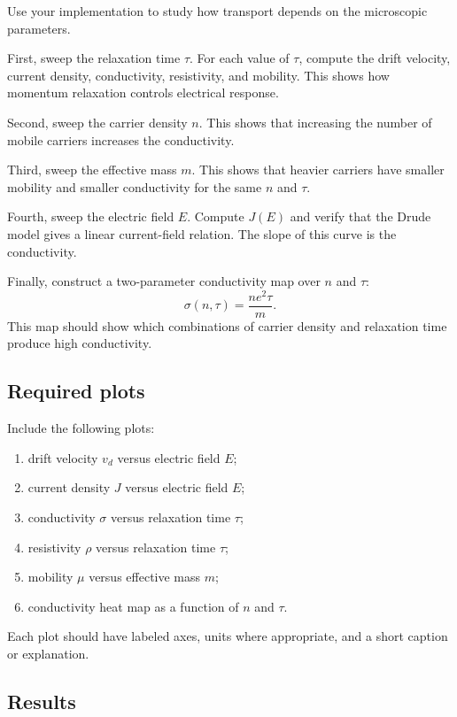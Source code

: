 Use your implementation to study how transport depends on the microscopic parameters.

First, sweep the relaxation time \(\tau\). For each value of \(\tau\), compute the drift velocity, current density, conductivity, resistivity, and mobility. This shows how momentum relaxation controls electrical response.

Second, sweep the carrier density \(n\). This shows that increasing the number of mobile carriers increases the conductivity.

Third, sweep the effective mass \(m\). This shows that heavier carriers have smaller mobility and smaller conductivity for the same \(n\) and \(\tau\).

Fourth, sweep the electric field \(E\). Compute \(J(E)\) and verify that the Drude model gives a linear current-field relation. The slope of this curve is the conductivity.

Finally, construct a two-parameter conductivity map over \(n\) and \(\tau\):
\[
\sigma(n,\tau)=\frac{ne^2\tau}{m}.
\]
This map should show which combinations of carrier density and relaxation time produce high conductivity.

\subsection{Required plots}

Include the following plots:

\begin{enumerate}
    \item drift velocity \(v_d\) versus electric field \(E\);
    \item current density \(J\) versus electric field \(E\);
    \item conductivity \(\sigma\) versus relaxation time \(\tau\);
    \item resistivity \(\rho\) versus relaxation time \(\tau\);
    \item mobility \(\mu\) versus effective mass \(m\);
    \item conductivity heat map as a function of \(n\) and \(\tau\).
\end{enumerate}

Each plot should have labeled axes, units where appropriate, and a short caption or explanation.

\subsection{Results}

